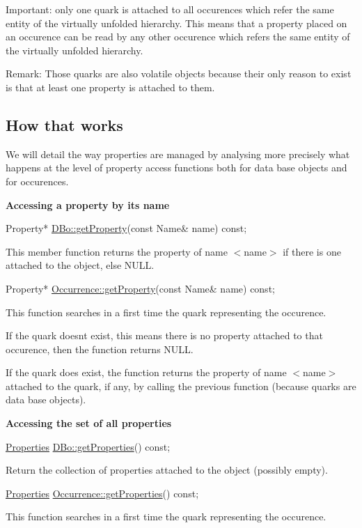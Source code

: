 \begin{DoxyParagraph}{Important\+: only one quark is attached to all occurences which refer the }
same entity of the virtually unfolded hierarchy. This means that a property placed on an occurence can be read by any other occurence which refers the same entity of the virtually unfolded hierarchy.
\end{DoxyParagraph}
\begin{DoxyParagraph}{Remark\+: Those quarks are also volatile objects because their only }
reason to exist is that at least one property is attached to them.
\end{DoxyParagraph}
\hypertarget{classHurricane_1_1Property_secPropertyHowThatWorks}{}\subsection{How that works}\label{classHurricane_1_1Property_secPropertyHowThatWorks}
We will detail the way properties are managed by analysing more precisely what happens at the level of property access functions both for data base objects and for occurences.

{\bfseries Accessing a property by its name} 
\begin{DoxyCode}
Property* \mbox{\hyperlink{classHurricane_1_1DBo_a599f61978df51d1d4c351f6cbd02488d}{DBo::getProperty}}(\textcolor{keyword}{const} Name& name) \textcolor{keyword}{const};
\end{DoxyCode}
 This member function returns the property of name {\ttfamily $<$name$>$} if there is one attached to the object, else N\+U\+LL. 
\begin{DoxyCode}
Property* \mbox{\hyperlink{classHurricane_1_1Occurrence_ab2b36b219037a2310f6527a35a9a266f}{Occurrence::getProperty}}(\textcolor{keyword}{const} Name& name) \textcolor{keyword}{const};
\end{DoxyCode}
 This function searches in a first time the quark representing the occurence.

If the quark doesn\textquotesingle{}t exist, this means there is no property attached to that occurence, then the function returns N\+U\+LL.

If the quark does exist, the function returns the property of name {\ttfamily $<$name$>$} attached to the quark, if any, by calling the previous function (because quarks are data base objects).

{\bfseries Accessing the set of all properties} 
\begin{DoxyCode}
\mbox{\hyperlink{namespaceHurricane_afd7bca6dad4be54b7c03b0463e6c0004}{Properties}}  \mbox{\hyperlink{classHurricane_1_1DBo_aec46894a10e83abb54c495dc4d90f2d3}{DBo::getProperties}}() \textcolor{keyword}{const};
\end{DoxyCode}
 Return the collection of properties attached to the object (possibly empty). 
\begin{DoxyCode}
\mbox{\hyperlink{namespaceHurricane_afd7bca6dad4be54b7c03b0463e6c0004}{Properties}}  \mbox{\hyperlink{classHurricane_1_1Occurrence_acbf59d6c01804e01f66d076c149abb49}{Occurrence::getProperties}}() \textcolor{keyword}{const};
\end{DoxyCode}
 This function searches in a first time the quark representing the occurence.

